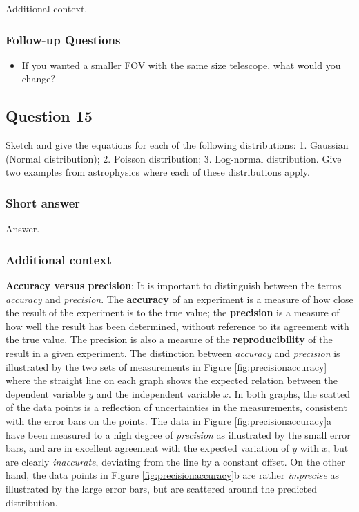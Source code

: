\documentclass[a4paper,10pt]{article}
\begin{document}
Additional context.

\subsubsection{Follow-up Questions}

\begin{itemize}
    \item If you wanted a smaller FOV with the same size telescope, what would you change?
\end{itemize}


\newpage
\subsection{Question 15}

Sketch and give the equations for each of the following distributions: 1. Gaussian (Normal distribution); 2. Poisson distribution; 3. Log-normal distribution. Give two examples from astrophysics where each of these distributions apply.

\subsubsection{Short answer}

Answer.

\subsubsection{Additional context}

\textbf{Accuracy versus precision}: It is important to distinguish between the terms \textit{accuracy} and \textit{precision}. The \textbf{accuracy} of an experiment is a measure of how close the result of the experiment is to the true value; the \textbf{precision} is a measure of how well the result has been determined, without reference to its agreement with the true value. The precision is also a measure of the \textbf{reproducibility} of the result in a given experiment. The distinction between \textit{accuracy} and \textit{precision} is illustrated by the two sets of measurements in Figure \ref{fig:precisionaccuracy} where the straight line on each graph shows the expected relation between the dependent variable $y$ and the independent variable $x$. In both graphs, the scatted of the data points is a reflection of uncertainties in the measurements, consistent with the error bars on the points. The data in Figure \ref{fig:precisionaccuracy}a have been measured to a high degree of \textit{precision} as illustrated by the small error bars, and are in excellent agreement with the expected variation of $y$ with $x$, but are clearly \textit{inaccurate}, deviating from the line by a constant offset. On the other hand, the data points in Figure \ref{fig:precisionaccuracy}b are rather \textit{imprecise} as illustrated by the large error bars, but are scattered around the predicted distribution.
\end{document}
